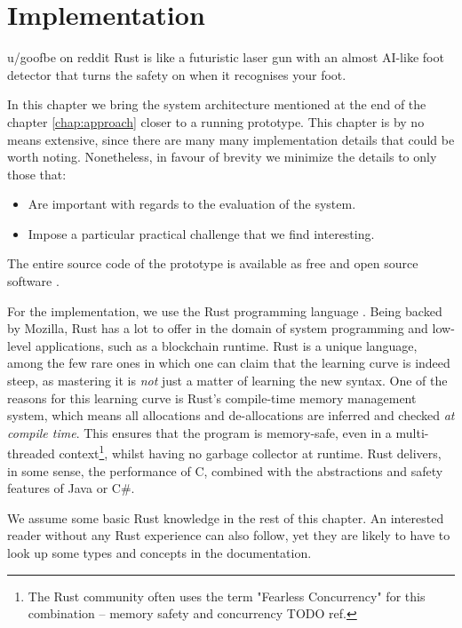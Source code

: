 \chapter{Implementation} \label{chap:impl}

\begin{chapquote}{u/goofbe on reddit}
	Rust is like a futuristic laser gun with an almost AI-like foot detector that turns the safety
	on when it recognises your foot.
\end{chapquote}

In this chapter we bring the system architecture mentioned at the end of the chapter
\ref{chap:approach} closer to a running prototype. This chapter is by no means
extensive, since there are many many implementation details that could be worth noting. Nonetheless,
in favour of brevity we minimize the details to only those that:

\begin{itemize}
	\item Are important with regards to the evaluation of the system.
	\item Impose a particular practical challenge that we find interesting.
\end{itemize}

The entire source code of the prototype is available as free and open source software \cite{paimaniKianenigmaSubSonic2020}.

For the implementation, we use the Rust programming language
\cite{klabnikRustProgrammingLanguage2019}. Being backed by Mozilla, Rust has a lot to offer in the
domain of system programming and low-level applications, such as a blockchain runtime. Rust is a
unique language, among the few rare ones in which one can claim that the learning curve is indeed
steep, as mastering it is \textit{not} just a matter of learning the new syntax. One of the reasons for this
learning curve is Rust's compile-time memory management system, which means all allocations and
de-allocations are inferred and checked \textit{at compile time}. This ensures that the program is
memory-safe, even in a multi-threaded context\footnote{The Rust community often uses the term "Fearless Concurrency" for this combination -- memory safety and concurrency TODO ref.}, whilst having no garbage collector at runtime. Rust delivers, in some sense, the performance
of C, combined with the abstractions and safety features of Java or
C\#\cite{jungRustBeltSecuringFoundations2017}.

\begin{remark}
	We assume some basic Rust knowledge in the rest of this chapter. An interested reader without
	any Rust experience can also follow, yet they are likely to have to look up some types and
	concepts in the documentation.
\end{remark}


